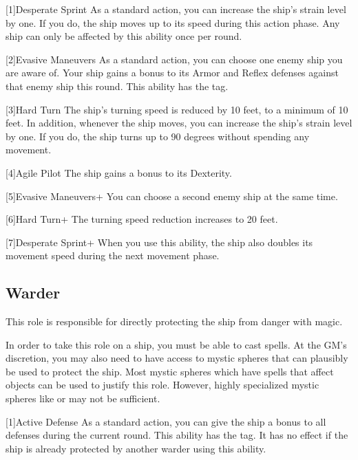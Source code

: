         [1]{Desperate Sprint} As a standard action, you can increase the ship's strain level by one.
        If you do, the ship moves up to its speed during this action phase.
        Any ship can only be affected by this ability once per round.

        [2]{Evasive Maneuvers} As a standard action, you can choose one enemy ship you are aware of.
        Your ship gains a  bonus to its Armor and Reflex defenses against that enemy ship this round.
        This ability has the  tag.

        [3]{Hard Turn} The ship's turning speed is reduced by 10 feet, to a minimum of 10 feet.
        In addition, whenever the ship moves, you can increase the ship's strain level by one.
        If you do, the ship turns up to 90 degrees without spending any movement.

        [4]{Agile Pilot} The ship gains a  bonus to its Dexterity.

        [5]{Evasive Maneuvers+} You can choose a second enemy ship at the same time.

        [6]{Hard Turn+} The turning speed reduction increases to 20 feet.

        [7]{Desperate Sprint+} When you use this ability, the ship also doubles its movement speed during the next movement phase.

    \subsection{Warder}
        This role is responsible for directly protecting the ship from danger with magic.

        In order to take this role on a ship, you must be able to cast spells.
        At the GM's discretion, you may also need to have access to mystic spheres that can plausibly be used to protect the ship.
        Most mystic spheres which have spells that affect objects can be used to justify this role.
        However, highly specialized mystic spheres like  or  may not be sufficient.

        [1]{Active Defense} As a standard action, you can give the ship a  bonus to all defenses during the current round.
        This ability has the  tag.
        It has no effect if the ship is already protected by another warder using this ability.

